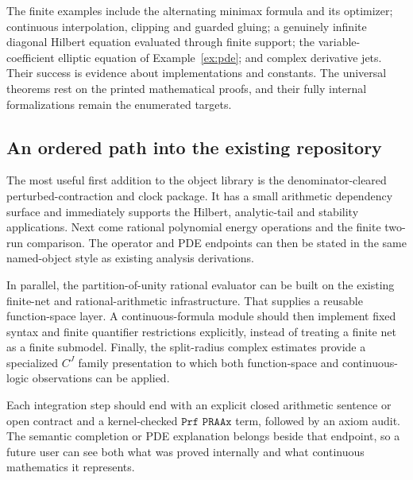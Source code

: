 The finite examples include the alternating minimax formula and its optimizer;
continuous interpolation, clipping and guarded gluing; a genuinely
infinite diagonal Hilbert equation evaluated through finite support;
the variable-coefficient elliptic equation of Example~\ref{ex:pde}; and
complex derivative jets. Their success is evidence about implementations
and constants. The universal theorems rest on the printed mathematical
proofs, and their fully internal formalizations remain the enumerated targets.

\subsection{An ordered path into the existing repository}

The most useful first addition to the object library is the
denominator-cleared perturbed-contraction and clock package.
It has a small arithmetic dependency surface and immediately supports the
Hilbert, analytic-tail and stability applications.
Next come rational polynomial energy operations and the finite
two-run comparison. The operator and PDE endpoints can then be stated in
the same named-object style as existing analysis derivations.

In parallel, the partition-of-unity rational evaluator can be built on the
existing finite-net and rational-arithmetic infrastructure. That supplies
a reusable function-space layer. A continuous-formula module should
then implement fixed syntax and finite quantifier restrictions explicitly,
instead of treating a finite net as a finite submodel. Finally, the
split-radius complex estimates provide a specialized \(C^J\) family
presentation to which both function-space and continuous-logic observations
can be applied.

Each integration step should end with an explicit closed arithmetic
sentence or open contract and a kernel-checked
\(\texttt{Prf PRAAx}\) term, followed by an axiom audit.
The semantic completion or PDE explanation belongs beside that endpoint,
so a future user can see both what was proved internally and what continuous
mathematics it represents.

